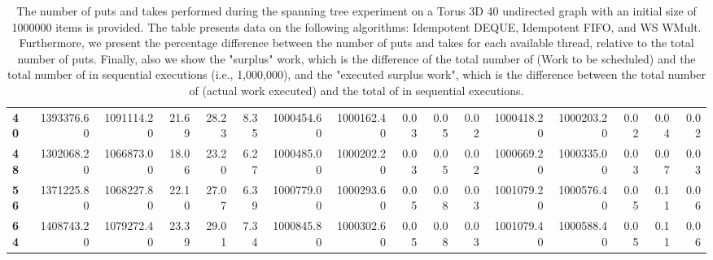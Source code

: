 \begin{table}[!ht]
{\begin{tabular}{lrrrrrrrrrrrrrrr}
\textbf{40} &       1393376.60 & 1091114.20 &          21.69 &       28.23 &                 8.35 &      1000454.60 & 1000162.40 &           0.03 &        0.05 &                 0.02 & 1000418.20 & 1000203.20 &           0.02 &        0.04 &                 0.02 \\
\textbf{48} &       1302068.20 & 1066873.00 &          18.06 &       23.20 &                 6.27 &      1000485.00 & 1000202.20 &           0.03 &        0.05 &                 0.02 & 1000669.20 & 1000335.00 &           0.03 &        0.07 &                 0.03 \\
\textbf{56} &       1371225.80 & 1068227.80 &          22.10 &       27.07 &                 6.39 &      1000779.00 & 1000293.60 &           0.05 &        0.08 &                 0.03 & 1001079.20 & 1000576.40 &           0.05 &        0.11 &                 0.06 \\
\textbf{64} &       1408743.20 & 1079272.40 &          23.39 &       29.01 &                 7.34 &      1000845.80 & 1000302.60 &           0.05 &        0.08 &                 0.03 & 1001079.40 & 1000588.40 &           0.05 &        0.11 &                 0.06 \\
\bottomrule
\end{tabular}}
\label{difference-Torus_3D_40_undirected-1000000-IDEMPOTENT_DEQUE-IDEMPOTENT_FIFO-WS_NC_MULT_OPT}
\caption{The number of puts and takes performed during the
    spanning tree experiment on a Torus 3D 40 undirected graph with an initial size
    of 1000000 items is provided. The table presents data on the
    following algorithms: Idempotent DEQUE, Idempotent FIFO, and
    WS WMult. Furthermore, we present the percentage difference
    between the number of puts and takes for each available thread,
    relative to the total number of puts. Finally, also we show the
    "surplus" work, which is the difference of the total number of
    \Puts (Work to be scheduled) and the total number of \Puts in
    sequential executions (i.e., 1,000,000), and the "executed surplus
    work", which is the difference between the total number of \Takes
    (actual work executed) and the total of \Takes in sequential
    executions.}
\end{table}
